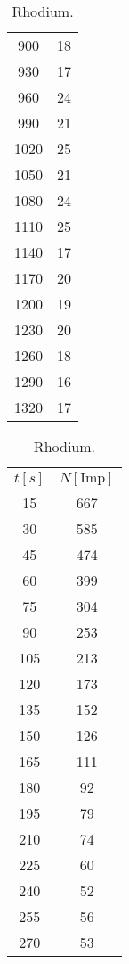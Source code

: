 \begin{table}
\begin{minipage}{.5\linewidth}
\begin{tabular}{c c}
        900	  & 18  \\
        930	  & 17  \\
        960	  & 24  \\
        990	  & 21  \\
        1020  & 25  \\
        1050  & 21  \\
        1080  & 24  \\
        1110  & 25  \\
        1140  & 17  \\
        1170  & 20  \\
        1200  & 19  \\
        1230  & 20  \\
        1260  & 18  \\
        1290  & 16  \\
        1320  & 17  \\
            \bottomrule
        \end{tabular}
    \end{minipage}
    \begin{minipage}{.5\linewidth}
        \centering
            \caption{Rhodium.}
            \label{tab:Rhodium}
            \begin{tabular}{c c}
            \toprule   
             $t[s]$ & $N [\text{Imp}]$ \\
            \midrule
            15	 & 667 \\
            30	 & 585 \\	 
            45	 & 474 \\
            60	 & 399 \\
            75	 & 304 \\
            90	 & 253 \\
            105	 & 213 \\
            120	 & 173 \\
            135	 & 152 \\
            150	 & 126 \\
            165	 & 111 \\
            180	 &  92 \\
            195	 &  79 \\
            210	 &  74 \\
            225	 &  60 \\
            240	 &  52 \\
            255	 &  56 \\
            270	 &  53 \\

\end{tabular}
\end{minipage}
\end{table}
